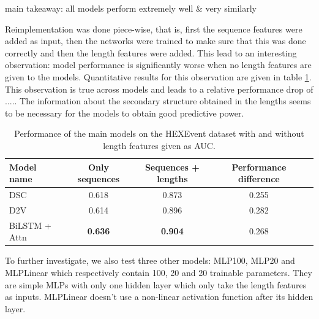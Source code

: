 main takeaway: all models perform extremely well \& very similarly






Reimplementation was done piece-wise, that is, first the sequence features were added as input, then the networks were trained to make sure that this was done correctly and then the length features were added. This lead to an interesting observation: model performance is significantly worse when no length features are given to the models. Quantitative results for this observation are given in table \ref{table:results_hexevent}. This observation is true across models and leads to a relative performance drop of ..... The information about the secondary structure obtained in the lengths seems to be necessary for the models to obtain good predictive power. 


\begin{table}[h!]
	\centering
	\begin{tabular}{| l | c | c | c| c} 
		\hline
		Model name & Only sequences & Sequences + lengths & Performance difference\\
		\hline
		DSC & 0.618 & 0.873 & 0.255\\
		D2V & 0.614 & 0.896 & 0.282\\
		BiLSTM + Attn & \textbf{0.636} & \textbf{0.904} & 0.268\\
		\hline
	\end{tabular}
	\caption{Performance of the main models on the HEXEvent dataset with and without length features given as AUC.  
	}
	\label{table:results_hexevent}
\end{table}


To further investigate, we also test three other models: MLP100, MLP20 and MLPLinear which respectively contain 100, 20 and 20 trainable parameters. They are simple MLPs with only one hidden layer which only take the length features as inputs. MLPLinear doesn't use a non-linear activation function after its hidden layer.


